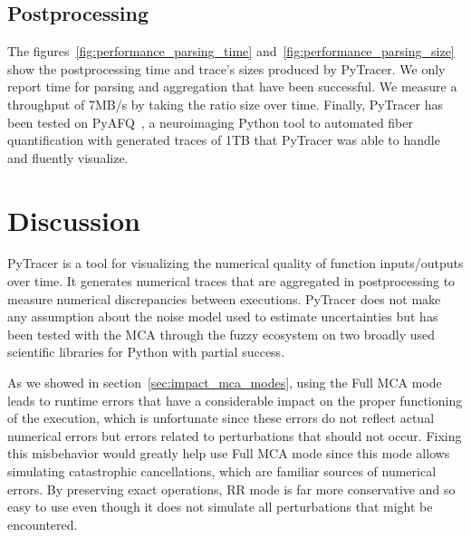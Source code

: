 \documentclass[11pt]{article}
\newcommand{\pytracer}[0]{PyTracer\xspace}
\begin{document}

\subsection{Postprocessing}

The figures~\ref{fig:performance_parsing_time} and~\ref{fig:performance_parsing_size} show
the postprocessing time and trace's sizes produced by \pytracer.
We only report time for parsing and aggregation that have been successful.
We measure a throughput of 7MB/s by taking the ratio size over time. 
Finally, \pytracer has been tested on PyAFQ~\cite{kruper2021evaluating}, a neuroimaging Python tool
to automated fiber quantification with generated traces of 
1TB that \pytracer was able to handle and fluently visualize.


\section{Discussion}

\pytracer is a tool for visualizing the numerical quality of function inputs/outputs over time.
It generates numerical traces that are aggregated in postprocessing to measure numerical discrepancies between executions.
\pytracer does not make any assumption about the noise model used to estimate uncertainties but has been tested with the MCA 
through the fuzzy ecosystem on two broadly used scientific libraries for Python with partial success.

As we showed in section~\ref{sec:impact_mca_modes}, using the Full MCA mode leads to runtime errors that have a considerable impact on the proper functioning of the execution, which is unfortunate since these
errors do not reflect actual numerical errors but errors related to perturbations that should not occur.
Fixing this misbehavior would greatly help use Full MCA mode since this mode allows simulating catastrophic cancellations, which are familiar sources of numerical errors. By preserving exact operations, RR mode is far more conservative and so easy to use even though it does not simulate all perturbations that might be encountered.
\end{document}
